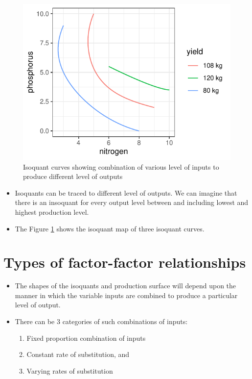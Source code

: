 \documentclass[12pt,ignorenonframetext,aspectratio=169]{beamer}
\providecommand{\tightlist}{%
  \setlength{\itemsep}{0pt}\setlength{\parskip}{0pt}}
\begin{document}
\begin{frame}{}
\protect\hypertarget{section}{}
\begin{figure}

{\centering \includegraphics[width=0.4\linewidth]{06-factor_factor_relationship_files/figure-beamer/np-factor-factor-output-1} 

}

\caption{Isoquant curves showing combination of various level of inputs to produce different level of outputs}\label{fig:np-factor-factor-output}
\end{figure}

\begin{itemize}
\tightlist
\item
  Isoquants can be traced to different level of outputs. We can imagine
  that there is an insoquant for every output level between and
  including lowest and highest production level.
\item
  The Figure \ref{fig:np-factor-factor-output} shows the isoquant map of
  three isoquant curves.
\end{itemize}
\end{frame}

\hypertarget{types-of-factor-factor-relationships}{%
\section{Types of factor-factor
relationships}\label{types-of-factor-factor-relationships}}

\begin{frame}{}
\protect\hypertarget{section-1}{}
\begin{itemize}
\tightlist
\item
  The shapes of the isoquants and production surface will depend upon
  the manner in which the variable inputs are combined to produce a
  particular level of output.
\item
  There can be 3 categories of such combinations of inputs:

  \begin{enumerate}
  \tightlist
  \item
    Fixed proportion combination of inputs
  \item
    Constant rate of substitution, and
  \item
    Varying rates of substitution
  \end{enumerate}
\end{itemize}
\end{frame}
\end{document}
